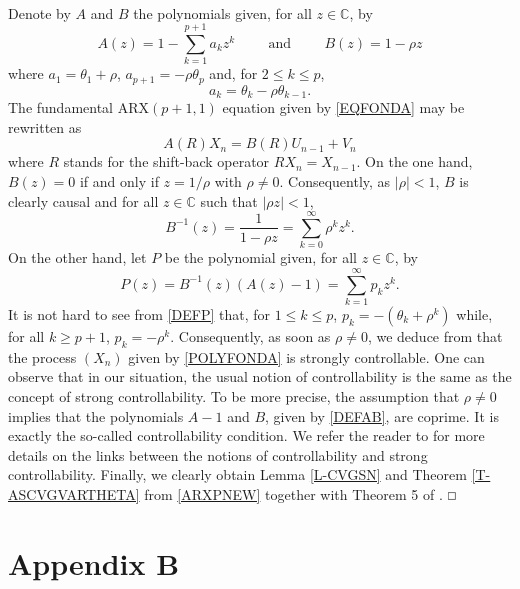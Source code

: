 \documentclass[article,12pt]{amsart}
\numberwithin{equation}{section}
\theoremstyle{plain}
\begin{document}
 
 \setcounter{section}{1}  
\setcounter{equation}{0}
\ \\
Denote by $A$ and $B$ the polynomials given, for all $z \in {\mathbb{C}}$, by
\begin{equation}
\label{DEFAB}
A(z) = 1 - \sum_{k=1}^{p+1} a_k z^k 
\hspace{1cm}\text{and} \hspace{1cm} 
B(z) = 1 - \rho z
\end{equation}
where $a_1= \theta_1 + \rho$, $a_{p+1}= - \rho \theta_p$ and, for $2\leq k \leq p$,
$$a_k= \theta_k - \rho \theta_{k-1}. $$
The fundamental $\text{ARX}(p+1,1)$ equation given by \eqref{EQFONDA} may be rewritten as
\begin{equation}
\label{POLYFONDA}
A(R) X_n = B(R) U_{n-1} + V_n
\end{equation}
where $R$ stands for the shift-back operator $RX_n = X_{n-1}$. On the one hand, $B(z)=0$
if and only if $z=1/\rho$ with $\rho \neq 0$. Consequently, as $|\rho|<1$, $B$ is clearly causal and
for all $z \in {\mathbb{C}}$ such that $|\rho z|<1$,
$$
B^{-1}(z)=\frac{1}{1-\rho z}=\sum_{k=0}^\infty \rho^k z^k.
$$
On the other hand, let $P$ be the polynomial given, for all $z \in {\mathbb{C}}$, by
\begin{equation}
\label{DEFP}
P(z)= B^{-1}(z)(A(z) - 1) = \sum_{k=1}^{\infty} p_k z^k. 
\end{equation}
It is not hard to see from \eqref{DEFP} that, for $1\leq k \leq p$, 
$p_k = -(\theta_k + \rho^k)$
while, for all $k \geq p+1$, $p_k=-\rho^k$. Consequently, as soon as $\rho \neq 0$, we deduce from
\cite{BeVa2} that the process $(X_n)$ given by \eqref{POLYFONDA} is strongly controllable.
One can observe that in our situation, the usual notion of controllability is the same as the concept
of strong controllability. To be more precise, the assumption that $\rho \neq 0$ implies that the polynomials
$A-1$ and $B$, given by \eqref{DEFAB}, are coprime. It is exactly the so-called controllability condition.
We refer the reader to \cite{BeVa2} for more details on the links between the notions of controllability and strong controllability.
Finally, we clearly obtain Lemma \ref{L-CVGSN} and Theorem \ref{T-ASCVGVARTHETA} from \eqref{ARXPNEW} together with
Theorem 5 of \cite{BeVa2}.
\hfill
$\mathbin{\vbox{\hrule\hbox{\vrule height1ex \kern.5em\vrule height1ex}\hrule}}$

\section*{Appendix B}
\end{document}
